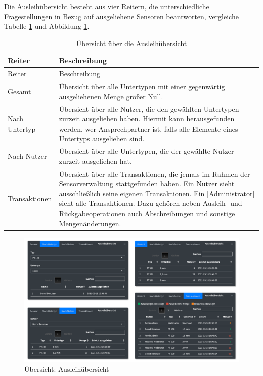 \documentclass[
]{article}
\begin{document}
Die Ausleihübersicht besteht aus vier Reitern, die unterschiedliche Fragestellungen in Bezug auf ausgeliehene Sensoren beantworten, vergleiche Tabelle \ref{tab:reporting-details} und Abbildung \ref{fig:reporting-details}.

\begin{longtable}[]{@{}
  >{\raggedright\arraybackslash}p{}
  >{\raggedright\arraybackslash}p{}@{}}
\caption{\label{tab:reporting-details} Übersicht über die Ausleihübersicht}\tabularnewline
\toprule
Reiter & Beschreibung \\
\midrule
\endfirsthead
\toprule
Reiter & Beschreibung \\
\midrule
\endhead
Gesamt & Übersicht über alle Untertypen mit einer gegenwärtig ausgeliehenen Menge größer Null. \\
Nach Untertyp & Übersicht über alle Nutzer, die den gewählten Untertypen zurzeit ausgeliehen haben. Hiermit kann herausgefunden werden, wer Ansprechpartner ist, falls alle Elemente eines Untertyps ausgeliehen sind. \\
Nach Nutzer & Übersicht über alle Untertypen, die der gewählte Nutzer zurzeit ausgeliehen hat. \\
Transaktionen & Übersicht über alle Transaktionen, die jemals im Rahmen der Sensorverwaltung stattgefunden haben. Ein Nutzer sieht ausschließlich seine eigenen Transaktionen. Ein {[}Administrator{]} sieht alle Transaktionen. Dazu gehören neben Ausleih- und Rückgabeoperationen auch Abschreibungen und sonstige Mengenänderungen. \\
\bottomrule
\end{longtable}

\begin{figure}
\centering
\includegraphics{./img/reporting_details.png}
\caption{\label{fig:reporting-details}Übersicht: Ausleihübersicht}
\end{figure}
\end{document}
